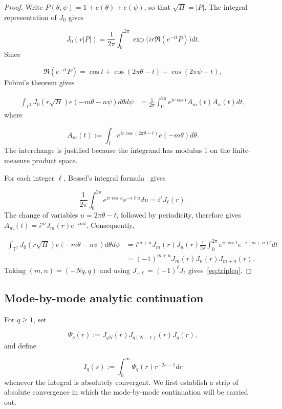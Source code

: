 \documentclass[11pt]{article}
\theoremstyle{plain}
\theoremstyle{definition}
\theoremstyle{remark}
\begin{document}
\begin{proof}
Write $P(\theta ,\psi ) = 1 + e(\theta ) + e(\psi )$, so that $\sqrt{H} = |P|$. The integral representation of $J_{0}$ gives

\[
  J_{0}(r|P|) = \frac{1}{2\pi } \int_{0}^{2\pi } \exp \big( ir \Re (e^{-it}P) \big) dt .
\]
Since

\[
  \Re (e^{-it}P) = \cos t + \cos (2\pi \theta - t) + \cos (2\pi \psi - t) ,
\]
Fubini's theorem gives

\begin{align*}
  \int_{\mathbb{T}^{2}} J_{0}(r\sqrt{H}) e(-m\theta - n\psi ) d\theta d\psi
  &= \frac{1}{2\pi } \int_{0}^{2\pi } e^{ir\cos t} A_m(t) A_n(t) dt ,
\end{align*}
where

\[
  A_m(t) := \int_{\mathbb{T}} e^{ir\cos (2\pi \theta - t)} e(-m\theta ) d\theta .
\]
The interchange is justified because the integrand has modulus $1$ on the finite-measure product space.

For each integer $\ell$, Bessel's integral formula~\cite[Eq.~10.9.2]{r1} gives

\[
  \frac{1}{2\pi } \int_{0}^{2\pi } e^{ir\cos u} e^{-i\ell u} du = i^\ell J_\ell (r) .
\]
The change of variables $u = 2\pi \theta - t$, followed by periodicity, therefore gives $A_m(t) = i^m J_m(r) e^{-imt}$. Consequently,

\begin{align*}
  \int_{\mathbb{T}^{2}} J_{0}(r\sqrt{H}) e(-m\theta - n\psi ) d\theta d\psi
  &= i^{m+n} J_m(r) J_n(r) \frac{1}{2\pi } \int_{0}^{2\pi } e^{ir\cos t} e^{-i(m+n)t} dt \\
  &= (-1)^{m+n} J_m(r) J_n(r) J_{m+n}(r) .
\end{align*}
Taking $(m,n) = (-Nq, q)$ and using $J_{-\ell } = (-1)^\ell J_\ell$ gives~\eqref{eq:tripleq}.
\end{proof}

\subsection{Mode-by-mode analytic continuation}\label{sub:3.3}
For $q \ge 1$, set

\[
  \Psi_q(r) := J_{qN}(r) J_{q(N-1)}(r) J_q(r) ,
\]
and define

\begin{equation}\label{eq:Iqdef}
  I_q(s) := \int_{0}^{\infty } \Psi_q(r) r^{-2s-1} dr
\end{equation}
whenever the integral is absolutely convergent. We first establish a strip of absolute convergence in which the mode-by-mode continuation will be carried out.
\end{document}
